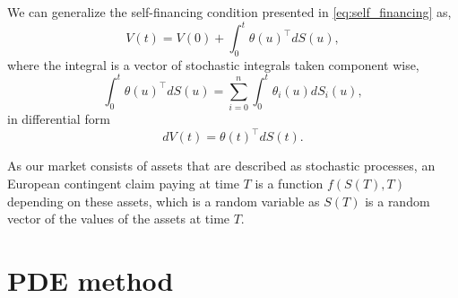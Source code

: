 We can generalize the self-financing condition presented in \eqref{eq:self_financing} as,
\begin{equation}\label{eq:self_financing_portfolio}
    V(t) = V(0) + \int_0^t \theta(u)^\intercal dS(u),
\end{equation}
where the integral is a vector of stochastic integrals taken component wise,
\begin{equation*}
    \int_0^t \theta(u)^\intercal dS(u) = \sum_{i = 0}^n \int_0^t \theta_i(u) dS_i(u),
\end{equation*}
in differential form
\begin{equation}\label{eq:self_financing_portfolio_diff}
    dV(t) = \theta(t)^\intercal dS(t).
\end{equation}

As our market consists of assets that are described as stochastic processes,
an European contingent claim paying at time $T$ is a function $f(S(T), T)$ depending on these assets,
which is a random variable as $S(T)$ is a random vector of the values of the assets at time $T$. 

\section{PDE method}\label{subsec:pde_method}

